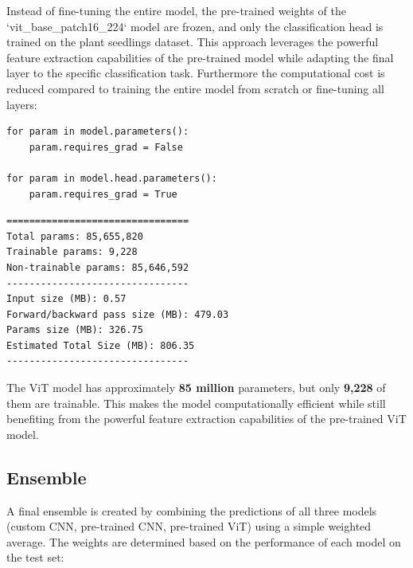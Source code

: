 Instead of fine-tuning the entire model, the pre-trained weights of the `vit\_base\_patch16\_224` model \cite{Wightman_PyTorch_Image_Models} are frozen, and only the classification head is trained on the plant seedlings dataset. This approach leverages the powerful feature extraction capabilities of the pre-trained model while adapting the final layer to the specific classification task. Furthermore the computational cost is reduced compared to training the entire model from scratch or fine-tuning all layers:

\begin{minipage}{0.9\linewidth}\begin{lstlisting}[caption={Freezing the pre-trained ViT backbone and training only the classification head.},label={lst:freeze-vit-backbone}]
for param in model.parameters():
    param.requires_grad = False

for param in model.head.parameters():
    param.requires_grad = True
\end{lstlisting}\end{minipage}

\begin{minipage}{0.9\linewidth}\begin{lstlisting}[language={},caption={Pre-trained ViT model summary.},label={lst:pre-trained-vit-summary}]
================================
Total params: 85,655,820
Trainable params: 9,228
Non-trainable params: 85,646,592
--------------------------------
Input size (MB): 0.57
Forward/backward pass size (MB): 479.03
Params size (MB): 326.75
Estimated Total Size (MB): 806.35
--------------------------------
\end{lstlisting}\end{minipage}

The ViT model has approximately \textbf{85 million} parameters, but only \textbf{9,228} of them are trainable. This makes the model computationally efficient while still benefiting from the powerful feature extraction capabilities of the pre-trained ViT model.

\subsection{Ensemble}

A final ensemble is created by combining the predictions of all three models (custom CNN, pre-trained CNN, pre-trained ViT) using a simple weighted average. The weights are determined based on the performance of each model on the test set:

